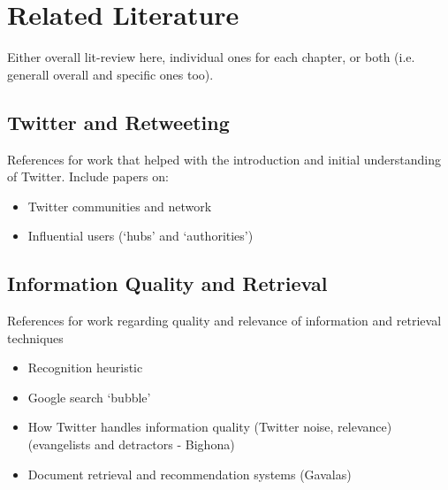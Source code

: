 \chapter{Related Literature}


Either overall lit-review here, individual ones for each chapter, or both (i.e. generall overall and specific ones too).

\section{Twitter and Retweeting}
References for work that helped with the introduction and initial understanding of Twitter. Include papers on:
\begin{itemize}
\item Twitter communities and network
\item Influential users (`hubs' and `authorities')
\end{itemize}

\section{Information Quality and Retrieval}
References for work regarding quality and relevance of information and retrieval techniques
\begin{itemize}
\item Recognition heuristic
\item Google search `bubble'
\item How Twitter handles information quality (Twitter noise, relevance) (evangelists and detractors - Bighona)
\item Document retrieval and recommendation systems (Gavalas)
\end{itemize}


